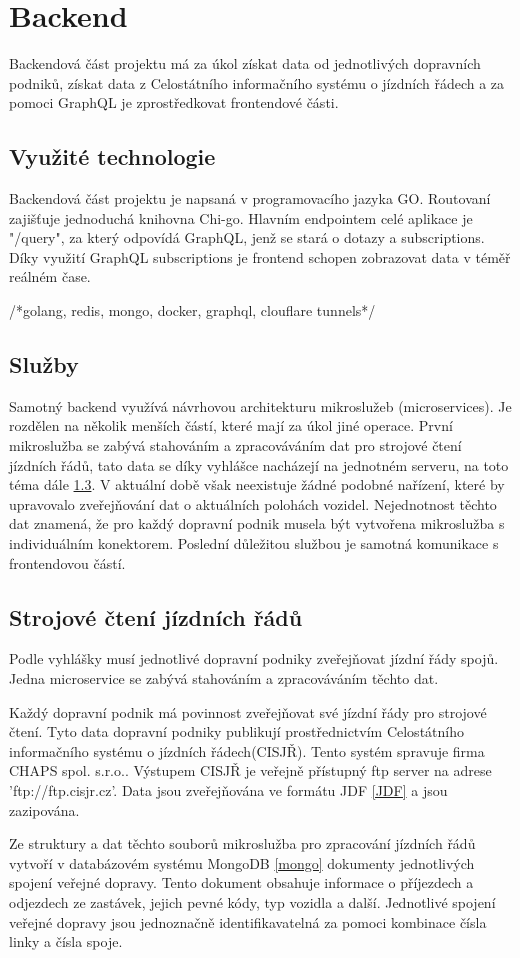 
\section{Backend}
Backendová část projektu má za úkol získat data od jednotlivých dopravních podniků, získat data z Celostátního informačního systému o jízdních řádech\cite{cisjr} a za pomoci GraphQL je zprostředkovat frontendové části.
\subsection{Využité technologie}
Backendová část projektu je napsaná v programovacího jazyka GO. Routovaní zajišťuje jednoduchá knihovna Chi-go. Hlavním endpointem celé aplikace je "/query", za který odpovídá GraphQL, jenž se stará o dotazy a subscriptions. Díky využití GraphQL subscriptions je frontend schopen zobrazovat data v téměř reálném čase.\par

/*golang, redis, mongo, docker, graphql, clouflare tunnels*/
\subsection{Služby}
Samotný backend využívá návrhovou architekturu mikroslužeb (microservices). Je rozdělen na několik menších částí, které mají za úkol jiné operace. První mikroslužba se zabývá stahováním a zpracováváním dat pro strojové čtení jízdních řádů, tato data se díky vyhlášce\cite{vyhlaskaJizdniRady} nacházejí na jednotném serveru, na toto téma dále \ref{strojoveCteniJR}. V aktuální době však neexistuje žádné podobné nařízení, které by upravovalo zveřejňování dat o aktuálních polohách vozidel. Nejednotnost těchto dat znamená, že pro každý dopravní podnik musela být vytvořena mikroslužba s individuálním konektorem. Poslední důležitou službou je samotná komunikace s frontendovou částí.
\subsection [Jízdní řády]{Strojové čtení jízdních řádů} \label{strojoveCteniJR}
Podle vyhlášky\cite{vyhlaskaJizdniRady} musí jednotlivé dopravní podniky zveřejňovat jízdní řády spojů. Jedna microservice se zabývá stahováním a zpracováváním těchto dat. \par
Každý dopravní podnik má povinnost zveřejňovat své jízdní řády pro strojové čtení. Tyto data dopravní podniky publikují prostřednictvím Celostátního informačního systému o jízdních řádech(CISJŘ)\cite{cisjr}. Tento systém spravuje firma CHAPS spol. s.r.o.\cite{chaps}. Výstupem CISJŘ je veřejně přístupný ftp server na adrese 'ftp://ftp.cisjr.cz'. Data jsou zveřejňována ve formátu JDF \ref{JDF} a jsou zazipována. \par
Ze struktury a dat těchto souborů mikroslužba pro zpracování jízdních řádů vytvoří v databázovém systému MongoDB \ref{mongo} dokumenty jednotlivých spojení veřejné dopravy. Tento dokument obsahuje informace o příjezdech a odjezdech ze zastávek, jejich pevné kódy, typ vozidla a další. Jednotlivé spojení veřejné dopravy jsou jednoznačně identifikavatelná za pomoci kombinace čísla linky a čísla spoje.
